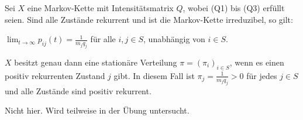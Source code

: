 \documentclass[a4paper,twoside,DIV15,BCOR12mm]{scrbook}
\begin{document}
\begin{satz}
Sei $X$ eine Markov-Kette mit Intensitätsmatrix $Q$, wobei (Q1) bis (Q3) erfüllt seien. Sind alle Zustände rekurrent und ist die Markov-Kette irreduzibel, so gilt:\label{satz:8.7}
\begin{enuma}
\item $\lim_{t\to\infty} p_{ij}(t) = \frac1{m_j q_j}$ für alle $i,j\in S$, unabhängig von $i\in S$.
\item $X$ besitzt genau dann eine stationäre Verteilung $\pi=(\pi_i)_{i\in S}$, wenn es einen positiv rekurrenten Zustand $j$ gibt. In diesem Fall ist $\pi_j = \frac1{m_j q_j}>0$ für jedes $j\in S$ und alle Zustände sind positiv rekurrent.
\end{enuma}
\end{satz}

\begin{beweis}
Nicht hier. Wird teilweise in der Übung untersucht.
\end{beweis}
\end{document}
